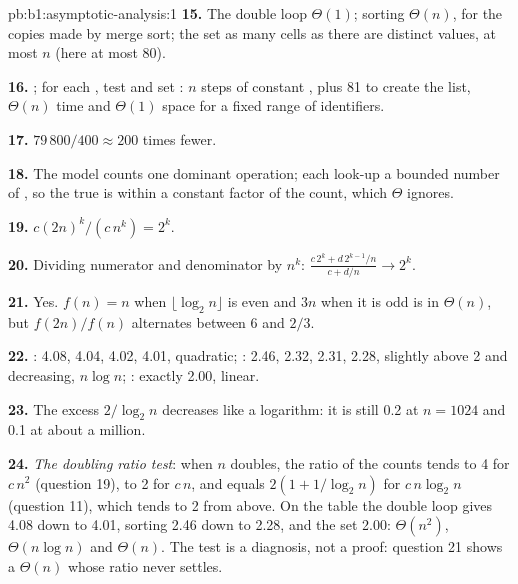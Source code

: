 \begin{solution}{pb:b1:asymptotic-analysis:1}
\textbf{15.} The double loop $\Theta(1)$; sorting $\Theta(n)$, for the copies made by merge sort; the set as many cells
as there are distinct values, at most $n$ (here at most 80).

\textbf{16.} ; for each , test and set : $n$ steps of constant ,
plus 81 to create the list, $\Theta(n)$ time and $\Theta(1)$ space for a fixed range of identifiers.

\textbf{17.} $79\,800/400 \approx 200$ times fewer.

\textbf{18.} The model counts one dominant operation; each look-up  a bounded number of , so
the true  is within a constant factor of the count, which $\Theta$ ignores.

\textbf{19.} $c(2n)^k/(c\,n^k) = 2^k$.

\textbf{20.} Dividing numerator and denominator by $n^k$: $\frac{c\,2^k + d\,2^{k - 1}/n}{c + d/n} \to 2^k$.

\textbf{21.} Yes. $f(n) = n$ when $\lfloor \log_2 n \rfloor$ is even and $3n$ when it is odd is in $\Theta(n)$, but
$f(2n)/f(n)$ alternates between 6 and $2/3$.

\textbf{22.} : 4.08, 4.04, 4.02, 4.01, quadratic; : 2.46, 2.32, 2.31, 2.28, slightly above 2 and
decreasing, $n \log n$; : exactly 2.00, linear.

\textbf{23.} The excess $2/\log_2 n$ decreases like a logarithm: it is still 0.2 at $n = 1024$ and 0.1 at about a
million.

\textbf{24.} \emph{The doubling ratio test}: when $n$ doubles, the ratio of the counts tends to 4 for $c\,n^2$ (question
19), to 2 for $c\,n$, and equals $2(1 + 1/\log_2 n)$ for $c\,n \log_2 n$ (question 11), which tends to 2 from above. On
the table the double loop gives 4.08 down to 4.01, sorting 2.46 down to 2.28, and the set 2.00: $\Theta(n^2)$, $\Theta(n
\log n)$ and $\Theta(n)$. The test is a diagnosis, not a proof: question 21 shows a $\Theta(n)$  whose ratio never
settles.
\end{solution}
